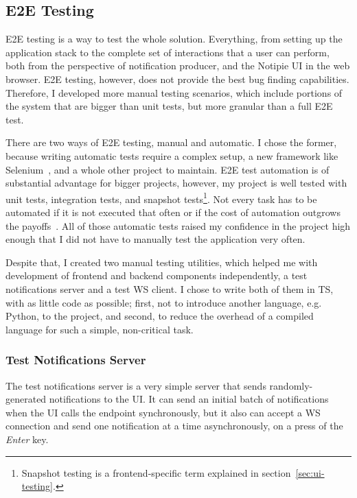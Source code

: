 \subsection{E2E Testing}\label{sec:e2e-testing}

\ac{E2E} testing is a way to test the whole solution.
Everything,
from setting up the application stack
to the complete set of interactions
that a user can perform,
both from the perspective of notification producer,
and the Notipie \ac{UI} in the web browser.
\ac{E2E} testing, however, does not provide
the best bug finding capabilities.
Therefore,
I developed more manual testing scenarios,
which include portions of the system
that are bigger than unit tests,
but more granular than a full \ac{E2E} test.

There are two ways of \ac{E2E} testing,
manual and automatic.
I chose the former,
because writing automatic tests
require a complex setup,
a new framework like Selenium~\cite{steward_selenium_2022},
and a whole other project to maintain.
\ac{E2E} test automation is of substantial advantage
for bigger projects, however,
my project is well tested with
unit tests,
integration tests, and
snapshot tests\footnote{
  Snapshot testing is a frontend-specific term
  explained in section~\ref{sec:ui-testing}.
}.
Not every task has to be automated
if it is not executed that often
or if the cost of automation outgrows
the payoffs~\cite{millett_patterns_2015}.
All of those automatic tests
raised my confidence in the project high enough
that I did not have to manually test
the application very often.

Despite that,
I created two manual testing utilities,
which helped me with development
of frontend and backend components independently,
a test notifications server
and a test \ac{WS} client.
I chose to write both of them in \ac{TS},
with as little code as possible;
first,
not to introduce another language,
e.g. Python,
to the project,
and second,
to reduce the overhead
of a compiled language
for such a simple,
non-critical task.

\subsubsection{Test Notifications Server}\label{sec:test-notifications-server}

The test notifications server
is a very simple server that sends
randomly-gene\-rated notifications to the \ac{UI}.
It can send an initial batch of notifications
when the \ac{UI} calls the endpoint synchronously,
but it also can accept a \ac{WS} connection
and send one notification at a time asynchronously,
on a press of the \textit{Enter} key.

